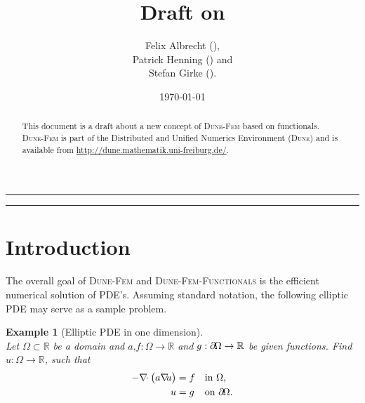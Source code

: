 \documentclass[a4paper,11pt]{article}
\title{Draft on \dunefemfunctionals}
\author{Felix Albrecht (\Code{felix.albrecht@uni-muenster.de}),\\
  Patrick Henning (\Code{patrick.henning@uni-muenster.de}) and\\
	Stefan Girke (\Code{s\_girk01@uni-muenster.de}).
}
\date{\today}
\numberwithin{equation}{section}
\newtheorem{example}[definition]{Example}
\newcommand{\theoremNewline}{\hspace{1mm}\\}
\newcommand{\theoremEndLine}{\hspace{1mm}}
\newcommand{\dune}{\textsc{Dune}\xspace}
\newcommand{\dunefem}{\textsc{Dune-Fem}\xspace}
\newcommand{\dunefemfunctionals}{\textsc{Dune-Fem-Functionals}\xspace}
\newcommand{\hnS}{\hspace{-1.25pt}}
\newcommand{\divergence}{\nabla\hnS\hnS\hnS\cdot}
\newcommand{\gradient}{\nabla\hnS\hnS}
\newcommand{\boundary}{\partial \hnS}
\newcommand{\komma}{\text{,}}
\newcommand{\punkt}{\text{.}}
\newcommand{\R}{\mathbb{R}}
\begin{document}
  \maketitle

  \begin{abstract}
    This document is a draft about a new concept of \dunefem based on functionals. \dunefem is part of the
    Distributed and Unified Numerics Environment (\dune) and is available from
    \url{http://dune.mathematik.uni-freiburg.de/}.
  \end{abstract}

  \hrule

  \begin{small}
    \tableofcontents
  \end{small}

  \vspace{5mm}
  \hrule

  \section{Introduction}
    \label{section::introduction}

    The overall goal of \dunefem and \dunefemfunctionals is the efficient numerical solution of PDE's. Assuming standard
    notation, the following elliptic PDE may serve as a sample problem.

    \begin{example}[Elliptic PDE in one dimension]\theoremNewline
      \label{example::introduction::elliptic_pde}
      Let ${\Omega \subset \R}$ be a domain and ${a\komma f : \Omega \rightarrow \R}$ and
      ${g : \boundary\Omega \rightarrow \R}$ be given functions. Find ${u: \Omega \rightarrow \R}$, such that
      \begin{align}
        \label{equation::introduction::elliptic_pde}
        - \divergence
          \big(
            a \gradient u
          \big)
          &= f &&\text{in } \Omega \komma
        \\
        u &= g &&\text{on } \boundary\Omega \punkt
        \notag
      \end{align}
    \end{example}\theoremEndLine
\end{document}
